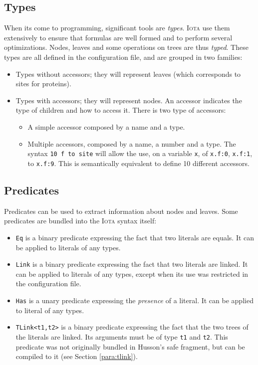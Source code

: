 \documentclass[10pt,a4paper]{article}
\newcommand\Iota{\textsc{Iota}}
\newcommand{\ocaml}{\texttt}
\begin{document}
\subsection{Types}
When its come to programming, significant tools are \emph{types}. \Iota{} use them extensively to ensure that formulas are well formed and to perform several optimizations.
Nodes, leaves and some operations on trees are thus \emph{typed}. These types are all defined in the configuration file, and are grouped in two families:
\begin{itemize}
\item Types without accessors; they will represent leaves (which corresponds to sites for proteins).
\item Types with accessors; they will represent nodes. An accessor indicates the type of children and how to access it. There is two type of accessors:
  \begin{itemize}
  \item A simple accessor composed by a name and a type.
  \item Multiple accessors, composed by a name, a number and a type. The syntax \ocaml{10 f to site} will allow the use, on a variable \ocaml{x}, of \ocaml{x.f:0}, \ocaml{x.f:1}, to \ocaml{x.f:9}. This is semantically equivalent to define 10 different accessors.
  \end{itemize}
\end{itemize}

\subsection{Predicates}
\label{subsec:predicates}
Predicates can be used to extract information about nodes and leaves. Some predicates are bundled into the \Iota{} syntax itself:
\begin{itemize}
\item \ocaml{Eq} is a binary predicate expressing the fact that two literals are equals. It can be applied to literals of any types.
\item \ocaml{Link} is a binary predicate expressing the fact that two literals are linked. It can be applied to literals of any types, except when its use was restricted in the configuration file.
\item \ocaml{Has} is a unary predicate expressing the \emph{presence} of a literal. It can be applied to literal of any types.
\item \ocaml{TLink<t1,t2>} is a binary predicate expressing the fact that the two trees of the literals are linked. Its arguments must be of type \ocaml{t1} and \ocaml{t2}. This predicate was not originally bundled in Husson's safe fragment, but can be compiled to it (see Section \ref{para:tlink}).
\end{itemize}
\end{document}
